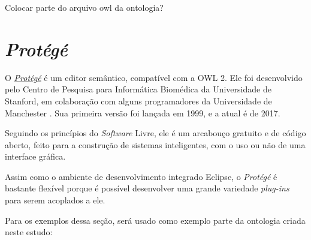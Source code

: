 {\color{red} Colocar parte do arquivo owl da ontologia?}

\section{\textit{Protégé}}

O \href{https://protege.stanford.edu}{\textit{Protégé}} é um editor semântico, compatível com a OWL 2. Ele foi desenvolvido pelo Centro de Pesquisa para Informática Biomédica da Universidade de Stanford, em colaboração com alguns programadores da Universidade de Manchester \cite{ferramentasProtege}. Sua primeira versão foi lançada em 1999, e a atual é de 2017.

Seguindo os princípios do \textit{Software} Livre, ele é um arcabouço gratuito e de código aberto, feito para a construção de sistemas inteligentes, com o uso ou não de uma interface gráfica.

Assim como o ambiente de desenvolvimento integrado Eclipse, o \textit{Protégé} é bastante flexível porque é possível desenvolver uma grande variedade \textit{plug-ins} para serem acoplados a ele.

Para os exemplos dessa seção, será usado como exemplo parte da ontologia criada neste estudo:

